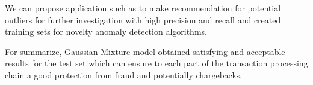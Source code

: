 \documentclass[20pt,a4paper]{article}
\begin{document}
We can propose application such as to make recommendation for potential outliers for further investigation with high precision and recall and created training sets for novelty anomaly detection algorithms.


For summarize, Gaussian Mixture model obtained satisfying and acceptable results for the test set which can ensure to each part of the transaction processing chain a good protection from fraud and potentially chargebacks.
\end{document}
